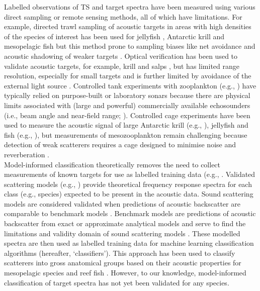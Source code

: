 Labelled observations of TS and target spectra have been measured using various direct sampling or remote sensing methods, all of which have limitations. For example, directed trawl sampling of acoustic targets in areas with high densities of the species of interest has been used for jellyfish \citep{Brierley2001}, Antarctic krill \citep{Hewitt1996} and mesopelagic fish \citep{Sobradillo2019} but this method prone to sampling biases like net avoidance and acoustic shadowing of weaker targets \citep{Pena2018}. Optical verification has been used to validate acoustic targets, for example, krill \citep{Lawson2006} and salps \citep{Wiebe2010}, but has limited range resolution, especially for small targets \citep{Trenkel2011} and is further limited by avoidance of the external light source \citep{Geoffroy2021}. Controlled tank experiments 
 with zooplankton (e.g., \citealt{Pauly1998, Stanton1998, McGehee1998}) have typically relied on purpose-built or laboratory sonars \citep{Amakasu2006, Conti2005} because there are physical limits associated with (large and powerful) commercially available echosounders (i.e., beam angle and near-field range; \cite{Simmonds2008}). Controlled cage experiments have been used to measure the acoustic signal of large Antarctic krill (e.g., \citealt{Foote1990}), jellyfish \citep{Monger1998} and fish (e.g., \citealt{Gugele2021, Legua2017}), but measurements of mesozooplankton remain challenging because detection of weak scatterers requires a cage designed to minimise noise and reverberation \citep{Knutsen1997}.\\
Model-informed classification theoretically removes the need to collect measurements of known targets for use as labelled training data (e.g., \cite{Cotter2021}. Validated scattering models (e.g., \citealt{Korneliussen2003, Cotter2021, Pena2018}) provide theoretical frequency response spectra for each class (e.g., species) expected to be present in the acoustic data.  Sound scattering models are considered validated when predictions of acoustic backscatter are comparable to benchmark models \citep{Gastauer2019}. Benchmark models are predictions of acoustic backscatter from exact or approximate analytical models and serve to find the limitations and validity domain of sound scattering models \citep{Jech2015}. These modelled spectra are then used as labelled training data for machine learning classification algorithms (hereafter, `classifiers'). This approach has been used to classify scatterers into gross anatomical groups based on their acoustic properties for mesopelagic species \citep{Cotter2021} and reef fish \citep{Roa2022}. However, to our knowledge, model-informed classification of target spectra has not yet been validated for any species.  \\
